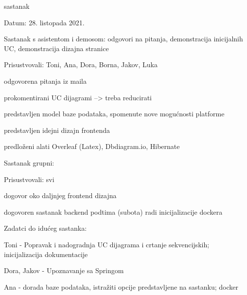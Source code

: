 \begin{packed_enum}
	        \bigskip  %
	        \item sastanak
            \item[] \begin{packed_item}
               \item Datum: 28. listopada 2021.
               \item Sastanak s asistentom i demosom: odgovori na pitanja, demonstracija inicijalnih UC, demonstracija dizajna stranice
               \item[] \begin{packed_item}
                    \item Prisustvovali: Toni, Ana, Dora, Borna, Jakov, Luka
                    \item odgovorena pitanja iz maila
                    \item prokomentirani UC dijagrami --> treba reducirati
                    \item predstavljen model baze podataka, spomenute nove mogućnosti platforme
                    \item predstavljen idejni dizajn frontenda
                    \item predloženi alati Overleaf (Latex), Dbdiagram.io, Hibernate
               \end{packed_item}
               \item Sastanak grupni:
               \item[] \begin{packed_item}
                    \item Prisustvovali: svi
                    \item dogovor oko daljnjeg frontend dizajna
                    \item dogovoren sastanak backend podtima (subota) radi inicijalizacije dockera
               \end{packed_item}
               \item Zadatci do idućeg sastanka:
               \item[] \begin{packed_item}
                    \item Toni - Popravak i nadogradnja UC dijagrama i crtanje sekvencijskih; inicijalizacija dokumentacije
                    \item Dora, Jakov - Upoznavanje sa Springom
                    \item Ana - dorada baze podataka, istražiti opcije predstavljene na sastanku; docker

\end{packed_item}
\end{packed_item}
\end{packed_enum}
